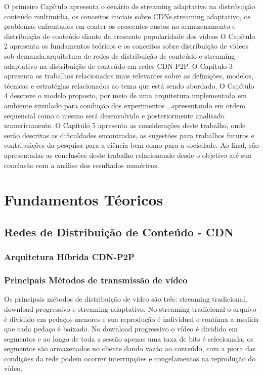 \documentclass[
	12pt,				%
	oneside,			%
	a4paper,			%
	english,			%
	brazil				%
	]{abntex2ppgsi}
\begin{document}
O primeiro Capítulo apresenta o cenário de streaming adaptativo na distribuição conteúdo multimídia, os conceitos iniciais sobre CDNs,streaming adaptativo, os problemas enfrentados em conter os crescentes custos no armazenamento e distribuição de conteúdo diante da crescente popularidade dos vídeos
O Capítulo 2 apresenta os fundamentos teóricos e os conceitos sobre distribuição de vídeos sob demanda,arquitetura de redes de distribuição de conteúdo e streaming adaptativo na distribuição de conteúdo em redes CDN-P2P.
O Capítulo 3 apresenta os trabalhos relacionados mais relevantes sobre as definições, modelos, técnicas e estratégias relacionados ao tema que está sendo abordado. 
O Capítulo 4 descreve o modelo proposto, por meio de uma arquitetura implementada em ambiente simulado para condução dos experimentos , apresentando em ordem sequencial como o mesmo será desenvolvido e posteriormente analisado numericamente.
O Capítulo 5 apresenta as considerações deste trabalho, onde serão descritas as dificuldades encontradas, as sugestões para trabalhos futuros e contribuições da pesquisa para a ciência bem como para a sociedade. Ao final, são apresentadas as conclusões deste trabalho relacionando desde o objetivo até sua conclusão com a análise dos resultados numéricos.



\chapter{Fundamentos Téoricos}

\section{Redes de Distribuição de Conteúdo - CDN}

 

\subsection{Arquitetura Híbrida CDN-P2P}






\subsection{Principais Métodos de transmissão de vídeo}

Os principais métodos de distribuição de vídeo são três: streaming tradicional, download progressivo e streaming adaptativo. No streaming tradicional o arquivo  é dividido em pedaços menores e sua reprodução é individual e contínua a medida que cada pedaço é baixado. No download progressivo o vídeo é dividido em segmentos e ao longo de toda a  sessão  apenas uma taxa de bits é selecionada, os segmentos são armazenados no cliente dando vazão ao conteúdo, com a piora das condições da rede podem ocorrer interrupções e congelamentos na reprodução do vídeo.
\end{document}
